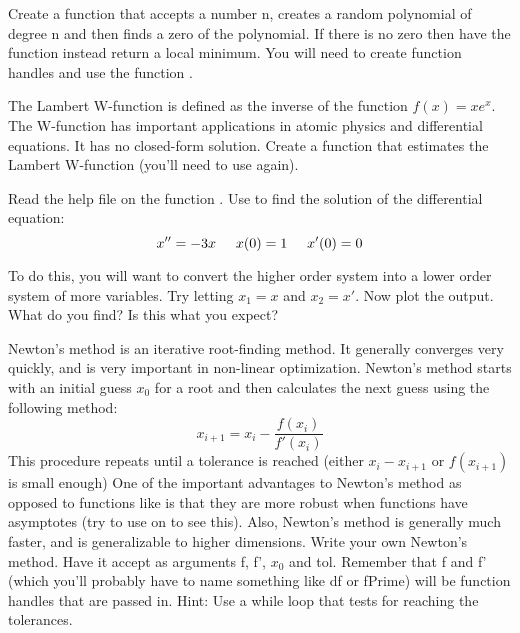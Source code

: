\begin{problem}
Create a function that accepts a number n, creates a random polynomial of degree n and then finds a zero of the polynomial. If there is no zero then have the function instead return a local minimum. You will need to create function handles and use the function .
\end{problem}

\begin{problem}
The Lambert W-function is defined as the inverse of the function $f(x) = xe^x$. The W-function has important applications in atomic physics and differential equations. It has no closed-form solution. Create a function that estimates the Lambert W-function (you'll need to use  again).
\end{problem}

\begin{problem}
	Read the help file on the function . Use  to find the solution of the differential equation:
	\[
		x'' = -3x \hspace{5 mm} x(0) = 1 \hspace{5mm} x'(0) = 0
	\]
	
	To do this, you will want to convert the higher order system into a lower order system of more variables. Try letting $x_1 = x$ and $x_2 = x'$.
	Now plot the output. What do you find? Is this what you expect?
\end{problem}

\begin{problem}
Newton's method is an iterative root-finding method. It generally converges very quickly, and is very important in non-linear optimization. Newton's method starts with an initial guess $x_0$ for a root and then calculates the next guess using the following method:
\[
x_{i+1} = x_i - \frac{f(x_i)}{f'(x_i)}
\]
This procedure repeats until a tolerance is reached (either $x_i - x_{i+1}$ or $f(x_{i+1})$ is small enough)
One of the important advantages to Newton's method as opposed to functions like  is that they are more robust when functions have asymptotes (try to use  on  to see this). Also, Newton's method is generally much faster, and is generalizable to higher dimensions.
Write your own Newton's method. Have it accept as arguments f, f', $x_0$ and tol. Remember that f and f' (which you'll probably have to name something like df or fPrime) will be function handles that are passed in. Hint: Use a while loop that tests for reaching the tolerances.
\end{problem}
